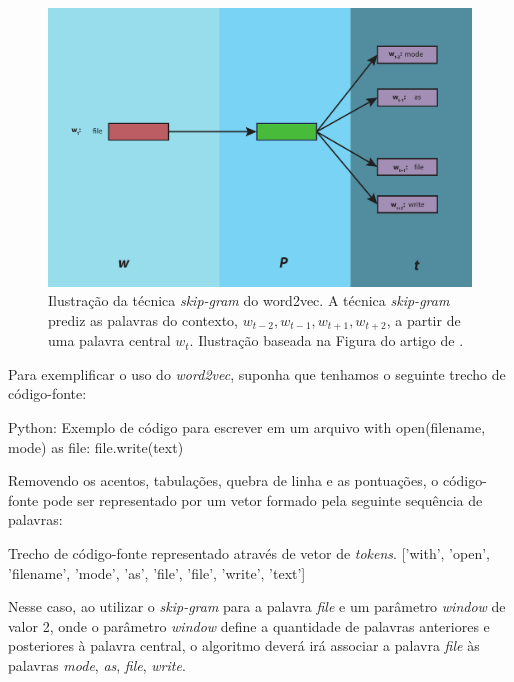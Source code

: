 \begin{figure}[H]
\centering
\includegraphics[width=.8\textwidth]{figuras/cap-trabalhos-relacionados/word2vec-skip-gram.pdf}
\caption[Ilustração da técnica \textit{skip-gram} do word2vec.]{Ilustração da técnica \textit{skip-gram} do word2vec. A técnica \textit{skip-gram} prediz as palavras do contexto, $w_{t - 2}, w_{t - 1}, w_{t + 1}, w_{t + 2}$, a partir de uma palavra central $w_{t}$. Ilustração baseada na Figura do artigo de \cite{mikolov2013distributed}. } 
\label{fig:word2vec-skip-gram}
\end{figure}

Para exemplificar o uso do \textit{word2vec}, suponha que tenhamos o seguinte trecho de código-fonte:

\begin{mypython}{Python: Exemplo de código para escrever em um arquivo}
with open(filename, mode) as file:
    file.write(text)
\end{mypython}

Removendo os acentos, tabulações, quebra de linha e as pontuações, o código-fonte pode ser representado por um vetor formado pela seguinte sequência de palavras:

\begin{mypythonembedding}{Trecho de código-fonte representado através de vetor de \textit{tokens}.}
  ['with', 'open', 'filename', 'mode', 'as', 'file', 'file', 'write', 'text']
\end{mypythonembedding}

Nesse caso, ao utilizar o \textit{skip-gram} para a palavra \emph{file} e um parâmetro \textit{window} de valor 2, onde o parâmetro \textit{window} define a quantidade de palavras anteriores e posteriores à palavra central, o algoritmo deverá irá associar a palavra \textit{file} às palavras \emph{mode}, \emph{as}, \emph{file}, \emph{write}.

